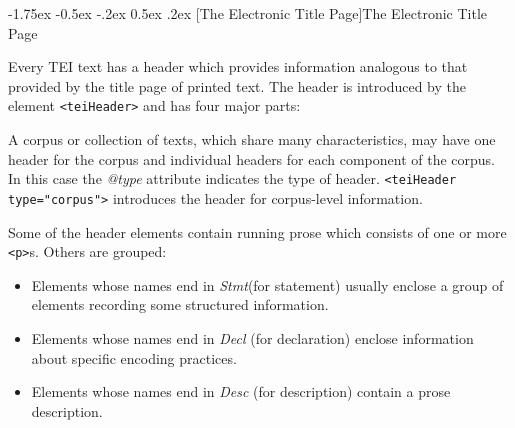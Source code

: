\documentclass[11pt,twoside]{article}\makeatletter
\makeatletter
\renewcommand\section{\@startsection {section}{1}{\z@}%
     {-1.75ex \@plus -0.5ex \@minus -.2ex}%
     {0.5ex \@plus .2ex}%
     {\reset@font\Large\bfseries\sffamily}}
\makeatother
\begin{document}
\section[{The Electronic Title Page}]{The Electronic Title Page}\label{U5-header}\par
Every TEI text has a header which provides information analogous to that provided by the title page of printed text. The header is introduced by the element \texttt{<teiHeader>} and has four major parts: \par
A corpus or collection of texts, which share many characteristics, may have one header for the corpus and individual headers for each component of the corpus. In this case the \textit{@type} attribute indicates the type of header. \texttt{<teiHeader type="corpus">} introduces the header for corpus-level information.\par
Some of the header elements contain running prose which consists of one or more \texttt{<p>}s. Others are grouped: \begin{itemize}
\item Elements whose names end in \textit{Stmt}(for statement) usually enclose a group of elements recording some structured information.
\item Elements whose names end in \textit{Decl} (for declaration) enclose information about specific encoding practices.
\item Elements whose names end in \textit{Desc} (for description) contain a prose description.
\end{itemize} 
\end{document}
